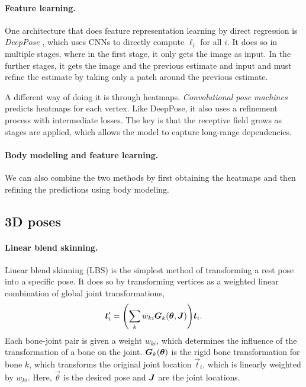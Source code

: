 \paragraph{Feature learning.}

One architecture that does feature representation learning by direct regression is
\textit{DeepPose} \citep{toshev2014deeppose}, which uses CNNs to directly compute $\ell_i$ for all
$i$. It does so in multiple stages, where in the first stage, it only gets the image as input. In
the further stages, it gets the image and the previous estimate and input and must refine the
estimate by taking only a patch around the previous estimate.

A different way of doing it is through heatmaps. \textit{Convolutional pose machines}
\citep{wei2016convolutional} predicts heatmaps for each vertex. Like DeepPose, it also uses a
refinement process with intermediate losses. The key is that the receptive field grows as stages
are applied, which allows the model to capture long-range dependencies.

\paragraph{Body modeling and feature learning.}

We can also combine the two methods by first obtaining the heatmaps and then refining the
predictions using body modeling.

\subsection{3D poses}

\paragraph{Linear blend skinning.}

Linear blend skinning (LBS) is the simplest method of transforming a rest pose into a specific
pose. It does so by transforming vertices as a weighted linear combination of global joint
transformations, \[
    \vec{t}_i' = \lft( \sum_{k} w_{ki} \mat{G}_k(\vec{\theta}, \mat{J}) \rgt) \vec{t}_i.
\]
Each bone-joint pair is given a weight $w_{ki}$, which determines the influence of the
transformation of a bone on the joint. $\bm{G}_k(\bm{\theta})$ is the rigid bone transformation
for bone $k$, which transforms the original joint location $\vec{t}_i$, which is linearly weighted
by $w_{ki}$. Here, $\vec{\theta}$ is the desired pose and $\bm{J}$ are the joint locations.

